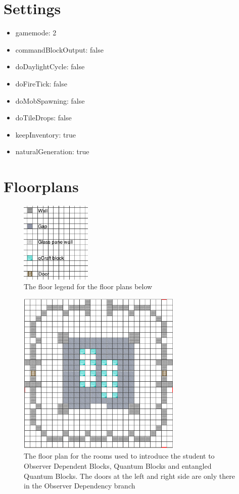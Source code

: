 \documentclass[11pt,twoside]{report} %
\begin{document}
\newpage

\section{Settings}
\label{app:settings}

\begin{itemize}
	\item gamemode: 2
	\item commandBlockOutput: false
	\item doDaylightCycle: false
	\item doFireTick: false
	\item doMobSpawning: false
	\item doTileDrops: false
	\item keepInventory: true
	\item naturalGeneration: true
\end{itemize}

\newpage

\section{Floorplans}

\begin{figure}[h!]
\centering
\includegraphics[width=0.3\textwidth]{legend}
\caption{The floor legend for the floor plans below}
\label{fig:legend}
\end{figure}

\begin{figure}[h!]
\centering
\includegraphics[width=0.7\textwidth]{qcraftblockrooms}
\caption{The floor plan for the rooms used to introduce the student to Observer Dependent Blocks, Quantum Blocks and entangled Quantum Blocks. The doors at the left and right side are only there in the Observer Dependency branch}
\label{fig:qcraftblockrooms}
\end{figure}
\end{document}
